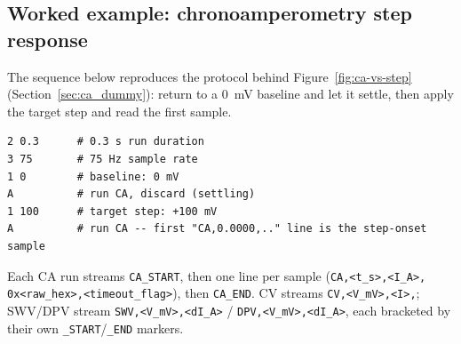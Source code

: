 \subsection{Worked example: chronoamperometry step response}
The sequence below reproduces the protocol behind
Figure~\ref{fig:ca-vs-step} (Section~\ref{sec:ca_dummy}): return to a
\SI{0}{\milli\volt} baseline and let it settle, then apply the target
step and read the first sample.
\begin{verbatim}
2 0.3      # 0.3 s run duration
3 75       # 75 Hz sample rate
1 0        # baseline: 0 mV
A          # run CA, discard (settling)
1 100      # target step: +100 mV
A          # run CA -- first "CA,0.0000,.." line is the step-onset sample
\end{verbatim}
Each CA run streams \texttt{CA\_START}, then one line per sample
(\texttt{CA,\allowbreak<t\_s>,\allowbreak<I\_A>,\allowbreak
0x<raw\_hex>,\allowbreak<timeout\_flag>}), then \texttt{CA\_END}. CV
streams \texttt{CV,<V\_mV>,<I>,}; SWV/DPV stream
\texttt{SWV,<V\_mV>,<dI\_A>} / \texttt{DPV,<V\_mV>,<dI\_A>}, each
bracketed by their own \texttt{\_START}/\allowbreak\texttt{\_END}
markers.
